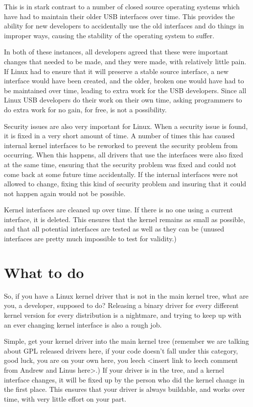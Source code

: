 \documentclass[a4paper,8pt,english]{sphinxmanual}
\begin{document}
This is in stark contrast to a number of closed source operating systems
which have had to maintain their older USB interfaces over time.  This
provides the ability for new developers to accidentally use the old
interfaces and do things in improper ways, causing the stability of the
operating system to suffer.

In both of these instances, all developers agreed that these were
important changes that needed to be made, and they were made, with
relatively little pain.  If Linux had to ensure that it will preserve a
stable source interface, a new interface would have been created, and
the older, broken one would have had to be maintained over time, leading
to extra work for the USB developers.  Since all Linux USB developers do
their work on their own time, asking programmers to do extra work for no
gain, for free, is not a possibility.

Security issues are also very important for Linux.  When a
security issue is found, it is fixed in a very short amount of time.  A
number of times this has caused internal kernel interfaces to be
reworked to prevent the security problem from occurring.  When this
happens, all drivers that use the interfaces were also fixed at the
same time, ensuring that the security problem was fixed and could not
come back at some future time accidentally.  If the internal interfaces
were not allowed to change, fixing this kind of security problem and
insuring that it could not happen again would not be possible.

Kernel interfaces are cleaned up over time.  If there is no one using a
current interface, it is deleted.  This ensures that the kernel remains
as small as possible, and that all potential interfaces are tested as
well as they can be (unused interfaces are pretty much impossible to
test for validity.)


\section{What to do}
\label{process/stable-api-nonsense:what-to-do}
So, if you have a Linux kernel driver that is not in the main kernel
tree, what are you, a developer, supposed to do?  Releasing a binary
driver for every different kernel version for every distribution is a
nightmare, and trying to keep up with an ever changing kernel interface
is also a rough job.

Simple, get your kernel driver into the main kernel tree (remember we
are talking about GPL released drivers here, if your code doesn't fall
under this category, good luck, you are on your own here, you leech
\textless{}insert link to leech comment from Andrew and Linus here\textgreater{}.)  If your
driver is in the tree, and a kernel interface changes, it will be fixed
up by the person who did the kernel change in the first place.  This
ensures that your driver is always buildable, and works over time, with
very little effort on your part.
\end{document}
